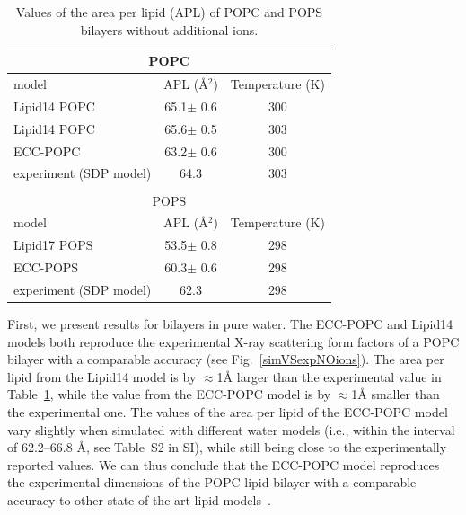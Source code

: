 \begin{table}[tb!] 
  \caption{Values of the area per lipid (APL) of POPC and POPS bilayers without additional ions. \label{tab:apls} 
  } 
  \begin{tabular}{l|c c} 
    \multicolumn{3}{c}{POPC} \\
    \hline 
    model          & APL (Å$^2$)   & Temperature (K) \\ 
    \hline 
    Lipid14 POPC                    & 65.1$\pm$ 0.6  &  300 \\ 
    Lipid14 POPC \citep{dickson14}  & 65.6$\pm$ 0.5  &  303 \\ 
    \hline 
    ECC-POPC     \citep{melcr18}    & 63.2$\pm$ 0.6  &  300       \\ 
    \hline 
    experiment (SDP model) \citep{kucerka11} & 64.3  &  303    \\ 
    \hline 
    \\
    \multicolumn{3}{c}{POPS} \\
    \hline 
    model          & APL (Å$^2$)   & Temperature (K) \\ 
    \hline 
    Lipid17 POPS              & 53.5$\pm$ 0.8  &  298 \\ 
    \hline 
    ECC-POPS                & 60.3$\pm$ 0.6  &  298       \\ 
    \hline 
    experiment (SDP model) \cite{SDP-CHARMM36_comparison_paper_Samuli-knows} & 62.3  &  298    \\ 
    \hline 
  \end{tabular} 
\end{table} 
 
 
First, we present results for bilayers in pure water. 
The ECC-POPC and Lipid14 models both reproduce the experimental X-ray scattering form factors 
of a POPC bilayer with a comparable accuracy (see Fig.~\ref{simVSexpNOions}). 
The area per lipid from the Lipid14 model is by $\approx$1Å larger than the 
experimental value in Table~\ref{tab:apls}, while the value from the ECC-POPC model 
is by $\approx$1Å smaller than the experimental one. 
The values of the area per lipid of the ECC-POPC model vary slightly 
when simulated with different water models (i.e., within the interval of 62.2--66.8 Å, see Table~S2 in SI), 
while still being close to the experimentally reported values. 
We can thus conclude that the ECC-POPC model reproduces the experimental dimensions of the POPC 
lipid bilayer with a comparable accuracy to other state-of-the-art lipid models~\citep{ollila16}. 
 
